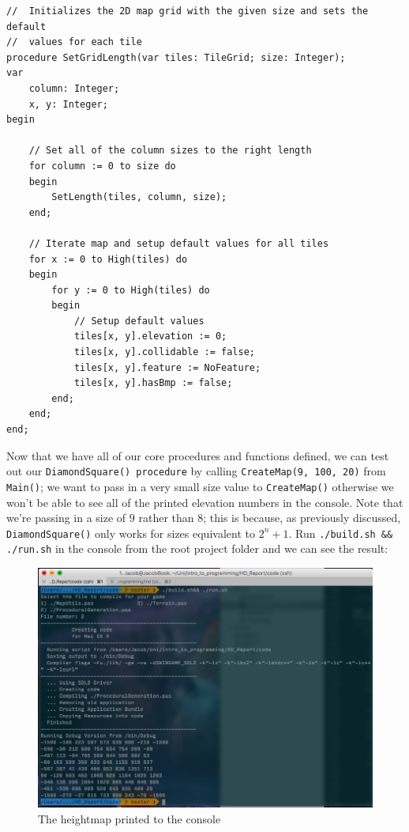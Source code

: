 \documentclass{article}
\begin{document}
\begin{verbatim}
//	Initializes the 2D map grid with the given size and sets the default 
//	values for each tile
procedure SetGridLength(var tiles: TileGrid; size: Integer);
var
	column: Integer;
	x, y: Integer;
begin

	// Set all of the column sizes to the right length
	for column := 0 to size do
	begin
		SetLength(tiles, column, size);
	end;

	// Iterate map and setup default values for all tiles
	for x := 0 to High(tiles) do
	begin
		for y := 0 to High(tiles) do
		begin
			// Setup default values
			tiles[x, y].elevation := 0;
			tiles[x, y].collidable := false;
			tiles[x, y].feature := NoFeature;
			tiles[x, y].hasBmp := false;
		end;
	end;
end;
\end{verbatim}

Now that we have all of our core procedures and functions defined, we can test out our \texttt{DiamondSquare() procedure} by calling \texttt{CreateMap(9, 100, 20)} from \texttt{Main()}; we want to pass in a very small size value to \texttt{CreateMap()} otherwise we won't be able to see all of the printed elevation numbers in the console. Note that we're passing in a size of $9$ rather than $8$; this is because, as previously discussed, \texttt{DiamondSquare()} only works for sizes equivalent to $2^{n}+1$. Run \texttt{./build.sh && ./run.sh} in the console from the root project folder and we can see the result:

\begin{figure}[H]
	\centering
	\renewcommand{\figurename}{Example}
	\includegraphics[width=0.9\linewidth,trim=4 4 4 4,clip]{printtoconsole.png}
	\caption{The heightmap printed to the console}
\end{figure}
\end{document}
